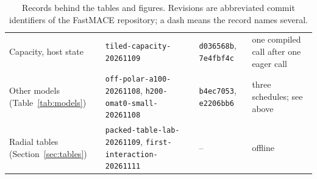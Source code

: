 \documentclass[11pt]{article}
\begin{document}
\begin{table}[H]
\begin{tabularx}{\textwidth}{>{\raggedright\arraybackslash}p{2.9cm}Y>{\raggedright\arraybackslash}p{1.9cm}>{\raggedright\arraybackslash}p{1.9cm}}
Capacity, host state & \texttt{tiled-capacity-20261109} & \texttt{d036568b}, \texttt{7e4fbf4c} & one compiled call after one eager call \\
Other models (Table~\ref{tab:models}) & \texttt{off-polar-a100-20261108}, \texttt{h200-omat0-small-20261108} & \texttt{b4ec7053}, \texttt{e2206bb6} & three schedules; see above \\
Radial tables (Section~\ref{sec:tables}) & \texttt{packed-table-lab-20261109}, \texttt{first-interaction-20261111} & -- & offline \\
\bottomrule
\end{tabularx}
\caption{Records behind the tables and figures. Revisions are abbreviated commit identifiers of the FastMACE
repository; a dash means the record names several.}
\label{tab:records}
\end{table}
\end{document}
